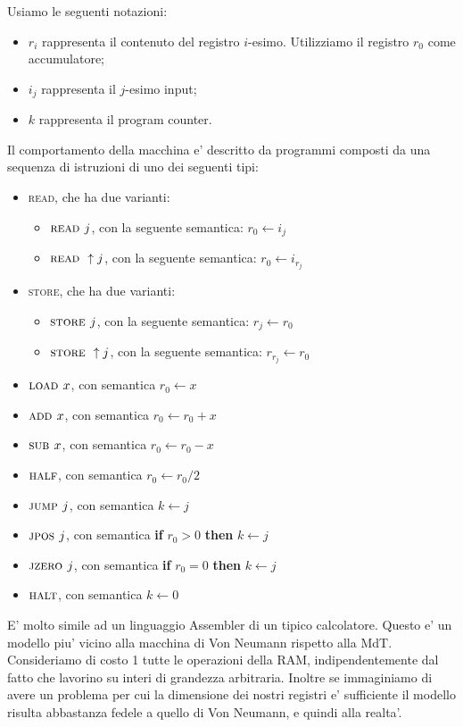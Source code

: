 Usiamo le seguenti notazioni:
\begin{itemize}
    \item $r_{i}$ rappresenta il contenuto del registro $i$-esimo. Utilizziamo il registro $r_{0}$
    come accumulatore;
    \item $i_{j}$ rappresenta il $j$-esimo input;
    \item $k$ rappresenta il program counter.
\end{itemize}
Il comportamento della macchina e' descritto da programmi composti da una sequenza di istruzioni di
uno dei seguenti tipi:
\begin{itemize}
    \item \textsc{read}, che ha due varianti:
    \begin{itemize}
        \item $\textsc{read }j$, con la seguente semantica: $r_{0} \gets i_{j}$ 
        \item $\textsc{read }\uparrow j$, con la seguente semantica: $r_{0} \gets i_{r_{j}}$ 
    \end{itemize}
    \item \textsc{store}, che ha due varianti:
    \begin{itemize}
        \item $\textsc{store }j$, con la seguente semantica: $r_{j} \gets r_{0}$ 
        \item $\textsc{store }\uparrow j$, con la seguente semantica: $r_{r_{j}} \gets r_{0}$ 
    \end{itemize}
    \item $\textsc{load }x$, con semantica $r_{0} \gets x$
    \item $\textsc{add }x$, con semantica $r_{0} \gets r_{0} + x$
    \item $\textsc{sub }x$, con semantica $r_{0} \gets r_{0} - x$
    \item $\textsc{half}$, con semantica $r_{0} \gets r_{0} / 2$
    \item $\textsc{jump }j$, con semantica $k \gets j$
    \item $\textsc{jpos }j$, con semantica \textbf{if} $r_{0} > 0$ \textbf{then} $k \gets j$
    \item $\textsc{jzero }j$, con semantica \textbf{if} $r_{0} = 0$ \textbf{then} $k \gets j$
    \item $\textsc{halt}$, con semantica $k \gets 0$
\end{itemize}

E' molto simile ad un linguaggio Assembler di un tipico calcolatore. Questo e' un modello piu'
vicino alla macchina di Von Neumann rispetto alla MdT. Consideriamo di costo 1 tutte le operazioni
della RAM, indipendentemente dal fatto che lavorino su interi di grandezza arbitraria. Inoltre se
immaginiamo di avere un problema per cui la dimensione dei nostri registri e' sufficiente il modello
risulta abbastanza fedele a quello di Von Neumann, e quindi alla realta'.

